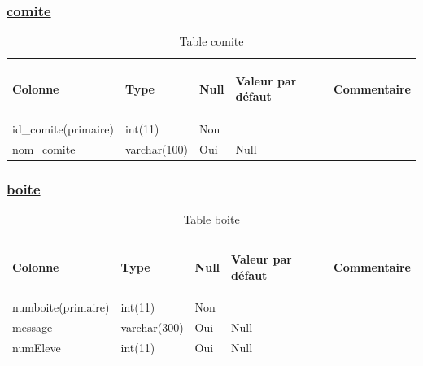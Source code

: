 \documentclass[11.5pt]{report}
\begin{document}
\subsubsection{\underline{comite}}
\begin{table}[h]
	\begin{center}
	\begin{tabular}{|l|l|l|l|l|}
		\hline
		\begin{bf}Colonne\end{bf} & \begin{bf}Type\end{bf} & \begin{bf}Null\end{bf} & \begin{bf}Valeur par défaut\end{bf} & \begin{bf}Commentaire\end{bf}  \\
		\hline
		id\_comite(primaire) & int(11) & Non & & \\
		\hline
		nom\_comite & varchar(100) & Oui &Null & \\
		\hline
		
		
	\end{tabular}
	\caption{Table comite}
\end{center}
\end{table}
\newpage
\subsubsection{\underline{boite}}
\begin{table}[h]
	\begin{center}
	\begin{tabular}{|l|l|l|l|l|}
		\hline
		\begin{bf}Colonne\end{bf} & \begin{bf}Type\end{bf} & \begin{bf}Null\end{bf} & \begin{bf}Valeur par défaut\end{bf} & \begin{bf}Commentaire\end{bf}  \\
		\hline
		numboite(primaire) & int(11) & Non & & \\
		\hline
		message & varchar(300) & Oui &Null & \\
		\hline
		numEleve & int(11) & Oui &Null & \\
		\hline
		
		
	\end{tabular}
	\caption{Table boite}
\end{center}
\end{table}
\end{document}
